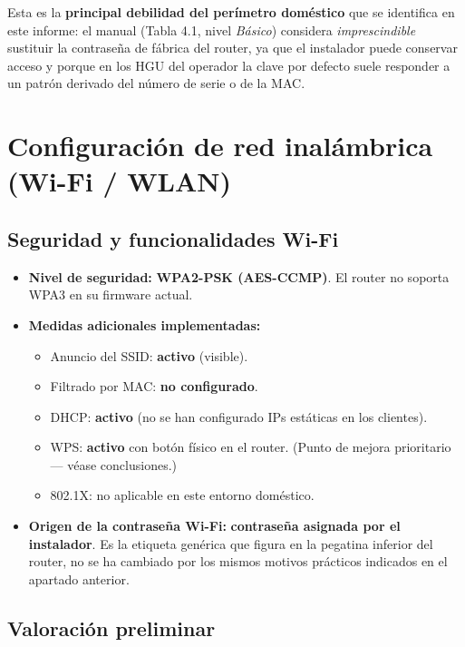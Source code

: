 Esta es la \textbf{principal debilidad del perímetro doméstico} que se identifica en este informe: el manual (Tabla 4.1, nivel \textit{Básico}) considera \emph{imprescindible} sustituir la contraseña de fábrica del router, ya que el instalador puede conservar acceso y porque en los HGU del operador la clave por defecto suele responder a un patrón derivado del número de serie o de la MAC.

\section{Configuración de red inalámbrica (Wi-Fi / WLAN)}

\subsection{Seguridad y funcionalidades Wi-Fi}

\begin{itemize}[leftmargin=*]
    \item \textbf{Nivel de seguridad:} \textbf{WPA2-PSK (AES-CCMP)}. El router no soporta WPA3 en su firmware actual.
    \item \textbf{Medidas adicionales implementadas:}
    \begin{itemize}
        \item Anuncio del SSID: \textbf{activo} (visible).
        \item Filtrado por MAC: \textbf{no configurado}.
        \item DHCP: \textbf{activo} (no se han configurado IPs estáticas en los clientes).
        \item WPS: \textbf{activo} con botón físico en el router. (Punto de mejora prioritario --- véase conclusiones.)
        \item 802.1X: no aplicable en este entorno doméstico.
    \end{itemize}
    \item \textbf{Origen de la contraseña Wi-Fi:} \textbf{contraseña asignada por el instalador}. Es la etiqueta genérica que figura en la pegatina inferior del router, no se ha cambiado por los mismos motivos prácticos indicados en el apartado anterior.
\end{itemize}

\subsection{Valoración preliminar}

